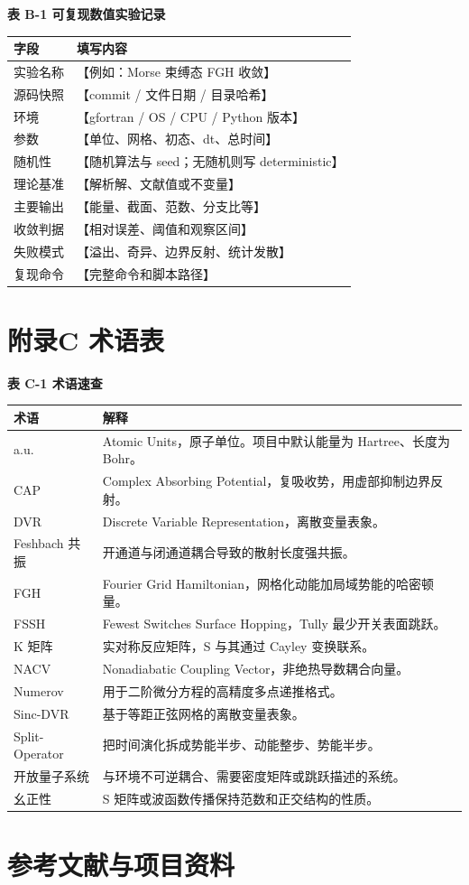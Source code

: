 \documentclass[UTF8,openany,11pt,fontset=fandol]{ctexbook}
\begin{document}
\textbf{表 B-1 可复现数值实验记录}

\begin{longtable}[]{@{}ll@{}}
\toprule
\textbf{字段} & \textbf{填写内容}\tabularnewline
\midrule
\endhead
实验名称 & 【例如：Morse 束缚态 FGH 收敛】\tabularnewline
源码快照 & 【commit / 文件日期 / 目录哈希】\tabularnewline
环境 & 【gfortran / OS / CPU / Python 版本】\tabularnewline
参数 & 【单位、网格、初态、dt、总时间】\tabularnewline
随机性 & 【随机算法与 seed；无随机则写 deterministic】\tabularnewline
理论基准 & 【解析解、文献值或不变量】\tabularnewline
主要输出 & 【能量、截面、范数、分支比等】\tabularnewline
收敛判据 & 【相对误差、阈值和观察区间】\tabularnewline
失败模式 & 【溢出、奇异、边界反射、统计发散】\tabularnewline
复现命令 & 【完整命令和脚本路径】\tabularnewline
\bottomrule
\end{longtable}

\chapter{附录C 术语表}\label{ux9644ux5f55c-ux672fux8bedux8868}

\textbf{表 C-1 术语速查}

\begin{longtable}[]{@{}ll@{}}
\toprule
\textbf{术语} & \textbf{解释}\tabularnewline
\midrule
\endhead
a.u. & Atomic Units，原子单位。项目中默认能量为 Hartree、长度为
Bohr。\tabularnewline
CAP & Complex Absorbing
Potential，复吸收势，用虚部抑制边界反射。\tabularnewline
DVR & Discrete Variable Representation，离散变量表象。\tabularnewline
Feshbach 共振 & 开通道与闭通道耦合导致的散射长度强共振。\tabularnewline
FGH & Fourier Grid
Hamiltonian，网格化动能加局域势能的哈密顿量。\tabularnewline
FSSH & Fewest Switches Surface Hopping，Tully
最少开关表面跳跃。\tabularnewline
K 矩阵 & 实对称反应矩阵，S 与其通过 Cayley 变换联系。\tabularnewline
NACV & Nonadiabatic Coupling Vector，非绝热导数耦合向量。\tabularnewline
Numerov & 用于二阶微分方程的高精度多点递推格式。\tabularnewline
Sinc-DVR & 基于等距正弦网格的离散变量表象。\tabularnewline
Split-Operator &
把时间演化拆成势能半步、动能整步、势能半步。\tabularnewline
开放量子系统 &
与环境不可逆耦合、需要密度矩阵或跳跃描述的系统。\tabularnewline
幺正性 & S 矩阵或波函数传播保持范数和正交结构的性质。\tabularnewline
\bottomrule
\end{longtable}

\chapter{参考文献与项目资料}\label{ux53c2ux8003ux6587ux732eux4e0eux9879ux76eeux8d44ux6599}
\end{document}
